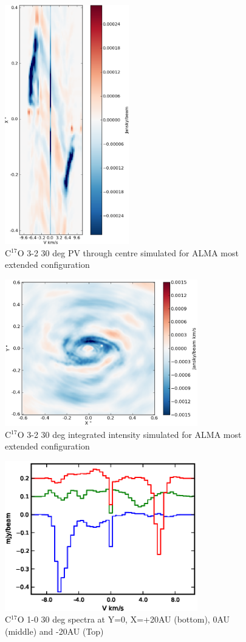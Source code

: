\documentclass[useAMS,usenatbib]{mn2e}
\begin{document}
\begin{figure}
 \includegraphics[width=54mm]{Figures/sim/casa_imageC17O_3-2_30deg_composite_ALMAwidth_dirty_PV_centre.eps}

 \caption{C$^{17}$O 3-2 30 deg PV through centre simulated for ALMA most extended configuration}
\end{figure}

\begin{figure}
 \includegraphics[width=84mm]{Figures/sim/casa_C17O_3-2_mom0.eps}

 \caption{C$^{17}$O 3-2 30 deg integrated intensity simulated for ALMA most extended configuration}
\end{figure}

\begin{figure}
 \includegraphics[width=84mm]{Figures/sim/casa_C17O_spectra_20AUsplit.eps}

 \caption{C$^{17}$O 1-0 30 deg spectra at Y=0, X=+20AU (bottom), 0AU (middle) and -20AU (Top)}
\end{figure}
\end{document}
